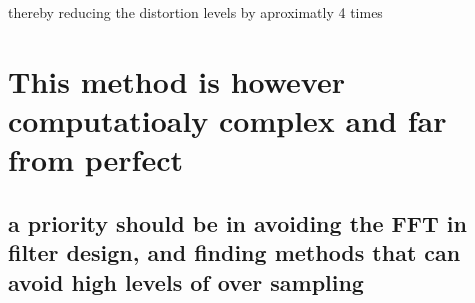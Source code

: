 \documentclass[11pt]{article}
\begin{document}
thereby reducing the distortion levels by aproximatly 4 times

    \hypertarget{this-method-is-however-computatioaly-complex-and-far-from-perfect}{%
\section{This method is however computatioaly complex and far from
perfect}\label{this-method-is-however-computatioaly-complex-and-far-from-perfect}}

\hypertarget{a-priority-should-be-in-avoiding-the-fft-in-filter-design-and-finding-methods-that-can-avoid-high-levels-of-over-sampling}{%
\subsection{a priority should be in avoiding the FFT in filter design,
and finding methods that can avoid high levels of over
sampling}\label{a-priority-should-be-in-avoiding-the-fft-in-filter-design-and-finding-methods-that-can-avoid-high-levels-of-over-sampling}}


    
    
    
    
\end{document}

